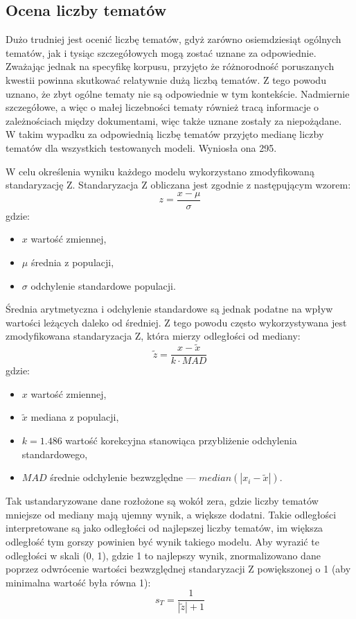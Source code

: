 	\subsection{Ocena liczby tematów}
		Dużo trudniej jest ocenić liczbę tematów, gdyż zarówno osiemdziesiąt ogólnych tematów,
			jak i tysiąc szczegółowych mogą zostać uznane za odpowiednie.
		Zważając jednak na specyfikę korpusu, przyjęto że różnorodność poruszanych kwestii powinna skutkować relatywnie dużą liczbą tematów.
		Z tego powodu uznano, że zbyt ogólne tematy nie są odpowiednie w tym kontekście.
		Nadmiernie szczegółowe, a więc o małej liczebności tematy również tracą informacje o zależnościach między dokumentami,
			więc także uznane zostały za niepożądane.
		W takim wypadku za odpowiednią liczbę tematów przyjęto medianę liczby tematów dla wszystkich testowanych modeli.
		Wyniosła ona 295.

		W celu określenia wyniku każdego modelu wykorzystano zmodyfikowaną standaryzację Z.
		Standaryzacja Z obliczana jest zgodnie z następującym wzorem:
		\[z=\frac{x-\mu}{\sigma}\]
		gdzie:
		\begin{itemize}
			\item \(x\) wartość zmiennej,
			\item \(\mu\) średnia z populacji,
			\item \(\sigma\) odchylenie standardowe populacji.
		\end{itemize}
		
		Średnia arytmetyczna i odchylenie standardowe są jednak podatne na wpływ wartości leżących daleko od średniej.
		Z tego powodu często wykorzystywana jest zmodyfikowana standaryzacja Z, która mierzy odległości od mediany:
		\[\tilde{z}=\frac{x-\tilde{x}}{k\cdot MAD}\]
		gdzie:
		\begin{itemize}
			\item \(x\) wartość zmiennej,
			\item \(\tilde{x}\) mediana z populacji,
			\item \(k=1.486\) wartość korekcyjna stanowiąca przybliżenie odchylenia standardowego,
			\item \(MAD\) średnie odchylenie bezwzględne --- \(median\left(|x_i-\tilde{x}|\right)\).
		\end{itemize}

		Tak ustandaryzowane dane rozłożone są wokół zera, gdzie liczby tematów mniejsze od mediany mają ujemny wynik, a większe dodatni.
		Takie odległości interpretowane są jako odległości od najlepszej liczby tematów,
			im większa odległość tym gorszy powinien być wynik takiego modelu.
		Aby wyrazić te odległości w skali (0, 1), gdzie 1 to najlepszy wynik, znormalizowano dane
			poprzez odwrócenie wartości bezwzględnej standaryzacji Z powiększonej o 1 (aby minimalna wartość była równa 1):
		\[s_T=\frac{1}{|\tilde{z}|+1}\]
